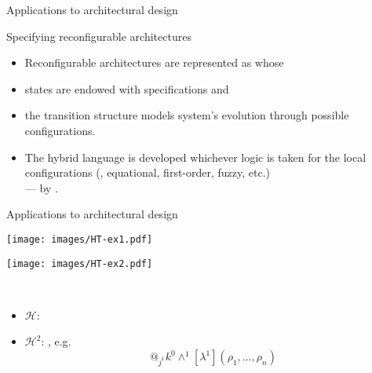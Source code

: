 \documentclass{beamer}
\begin{document}
\begin{slide}{Applications to architectural design}\label{s:55}
\small

\begin{block}{Specifying reconfigurable architectures}
\begin{itemize}
\item Reconfigurable architectures are represented as  whose
\item states are endowed with   specifications and
\item  the  transition structure models system's evolution  through possible configurations.
\item The hybrid language is developed  whichever logic is taken for the local configurations (\eg, equational, first-order, fuzzy, etc.) \\
--- by .
\end{itemize}
\end{block}


\begin{flushright}
\end{flushright}
\end{slide}

\begin{slide}{Applications to architectural design}\label{s:56}
\small

\begin{minipage}[b]{0.4\linewidth}
  \centering
 \texttt{[image: images/HT-ex1.pdf]}
\end{minipage}
\quad
\begin{minipage}[b]{0.5\linewidth}
  \centering
  \texttt{[image: images/HT-ex2.pdf]}
\end{minipage}
~\\

\begin{itemize}
\item $\mathcal{H}$: 
\item $\mathcal{H}^2$: , e.g. $$@_{j^1} k^0 \wedge^1 [\lambda^1] (\rho_1,\dots,\rho_n)$$
\end{itemize}

\end{slide}
\end{document}
